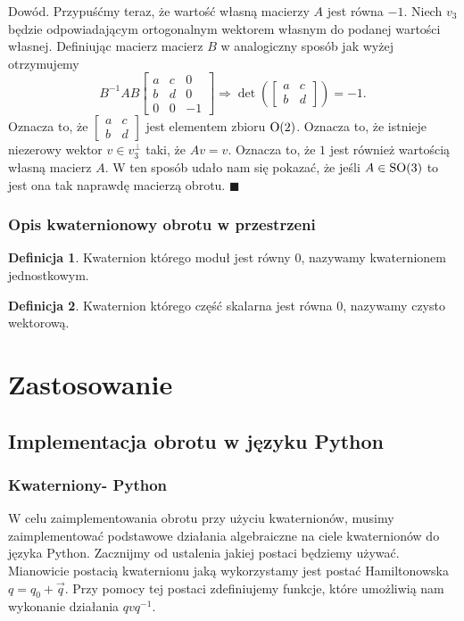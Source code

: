 \documentclass[a4paper,twoside,11pt,reqno]{mwrep}
\theoremstyle{plain} \newtheorem{twr}{Twierdzenie}
\theoremstyle{plain} \newtheorem{lem}{Lemat}
\theoremstyle{definition} \newtheorem{defi}{Definicja}
\theoremstyle{remark} \newtheorem*{wni}{Wniosek}
\theoremstyle{definition} \newtheorem{uwaga}{Uwaga}
\theoremstyle{definition}\newtheorem{prz}{Przykład}
\newenvironment{dowod}{\par\vspace{0.1cm}\par{\sc Dowód.}}{\hfill $\blacksquare$\par\vspace{0.4cm}\par}
\begin{document}
\begin{dowod}
Przypuśćmy teraz, że wartość własną macierzy $A$ jest równa $-1$. Niech $v_3$ będzie odpowiadającym
ortogonalnym wektorem własnym do podanej wartości własnej. Definiując macierz macierz $B$ w analogiczny
sposób jak wyżej otrzymujemy 
  $$B^{-1}AB\begin{bmatrix}
a&c   & 0\\
b&d & 0\\
0&0&-1
\end{bmatrix}\Longrightarrow \det\left(\begin{bmatrix}
a&c \\
b&d 
\end{bmatrix} \right) =-1.$$
Oznacza to, że $\begin{bmatrix}
a&c \\
b&d 
\end{bmatrix}$ jest elementem zbioru $\textup{O}(2)$. Oznacza to, że istnieje niezerowy wektor 
$v\in v^\perp_3$ taki, że $Av=v$. Oznacza  to, że $1$ jest również wartością własną macierz $A$.
W ten sposób udało nam się pokazać, że jeśli $A\in\textup{SO}(3)$ to jest ona tak naprawdę macierzą
obrotu.  
\end{dowod}
\subsection{Opis kwaternionowy obrotu w przestrzeni }
\begin{defi}
Kwaternion którego moduł jest równy $0$, nazywamy kwaternionem jednostkowym.
\end{defi}
\begin{defi}
Kwaternion którego część skalarna jest równa $0$, nazywamy czysto wektorową.
\end{defi}
\chapter{Zastosowanie}
\section{Implementacja obrotu w języku Python}
\subsection{Kwaterniony- Python}
W celu zaimplementowania obrotu przy użyciu kwaternionów, musimy zaimplementować
podstawowe działania algebraiczne na ciele kwaternionów do języka Python.
Zacznijmy od ustalenia jakiej postaci będziemy używać. Mianowicie postacią
kwaternionu jaką wykorzystamy jest postać Hamiltonowska $q=q_0+\overrightarrow{q}$.
Przy pomocy tej postaci zdefiniujemy funkcje, które umożliwią nam wykonanie 
działania $qvq^{-1}$.
 
\end{document}
